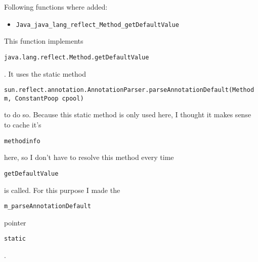 \documentclass[a4paper, 10pt, titlepage]{scrartcl} %
\begin{document}
Following functions where added:
\begin{itemize}
 \item \begin{scriptsize}\verb|Java_java_lang_reflect_Method_getDefaultValue|\end{scriptsize}
\end{itemize}
This function implements \begin{scriptsize}\verb|java|\hspace{0.0pt}\verb|.|\hspace{0.0pt}\verb|lang|\hspace{0.0pt}\verb|.|\hspace{0.0pt}\verb|reflect|\hspace{0.0pt}\verb|.|\hspace{0.0pt}\verb|Method|\hspace{0.0pt}\verb|.|\hspace{0.0pt}\verb|getDefaultValue|\end{scriptsize}. It
uses the static method \begin{scriptsize}\verb|sun|\hspace{0.0pt}\verb|.|\hspace{0.0pt}\verb|reflect|\hspace{0.0pt}\verb|.|\hspace{0.0pt}\verb|annotation|\hspace{0.0pt}\verb|.|\hspace{0.0pt}\verb|AnnotationParser|\hspace{0.0pt}\verb|.|\hspace{0.0pt}\verb|parseAnnotationDefault|\hspace{0.0pt}\verb|(|\hspace{0.0pt}\verb|Method|\hspace{0.0pt}\verb| |\hspace{0.0pt}\verb|m|\hspace{0.0pt}\verb|,|\hspace{0.0pt}\verb||\hspace{0.0pt}\verb| |\hspace{0.0pt}\verb|ConstantPoop|\hspace{0.0pt}\verb| |\hspace{0.0pt}\verb|cpool|\hspace{0.0pt}\verb|)|\hspace{0.0pt}\verb||\end{scriptsize} to do so.
Because this static method is only used here, I thought it makes sense to cache
it's \begin{scriptsize}\verb|methodinfo|\end{scriptsize} here, so I don't have to resolve this method every time
\begin{scriptsize}\verb|getDefaultValue|\end{scriptsize} is called. For this purpose I made the
\begin{scriptsize}\verb|m_parseAnnotationDefault|\end{scriptsize} pointer \begin{scriptsize}\verb|static|\end{scriptsize}.
\end{document}
